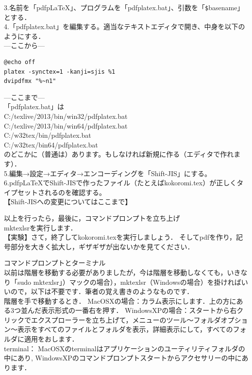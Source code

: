 \documentclass [10pt,fleqn,b5paper]{jsarticlek}
\begin{document}
3.名前を「pdfpLaTeX」、プログラムを「pdfplatex.bat」、引数を「\verb|$|basename」とする．\\
4.「pdfplatex.bat」を編集する。適当なテキストエディタで開き、中身を以下のようにする．\\
---ここから---
\begin{Verbatim}
@echo off
platex -synctex=1 -kanji=sjis %1
dvipdfmx "%~n1"
\end{Verbatim}
---ここまで---\\
「pdfplatex.bat」は\\
C:/texlive/2013/bin/win32/pdfplatex.bat\\
C:/texlive/2013/bin/win64/pdfplatex.bat\\
C:/w32tex/bin/pdfplatex.bat\\
C:/w32tex/bin64/pdfplatex.bat\\
のどこかに（普通は）あります。もしなければ新規に作る（エディタで作れます）．\\
5.編集→設定→エディタ→エンコーディングを「Shift-JIS」にする。\\
6.pdfpLaTeXでShift-JISで作ったファイル（たとえばkokoromi.tex）が正しくタイプセットされるのを確認する。\\

【{\gt Shift-JISへの変更についてはここまで}】
\vspace{2mm}

以上を行ったら，最後に，コマンドプロンプトを立ち上げ\\
mktexlsrを実行します．\\

【実験】さて，終了してkokoromi.texを実行しましょう．
そしてpdfを作り，記号部分を大きく拡大し，ギザギザが出ないかを見てください．


\kakkoshi\;コマンドプロンプトとターミナル\\
以前は階層を移動する必要がありましたが，今は階層を移動しなくても，いきなり「sudo mktexlsr」）マックの場合），mktexlsr（Windowsの場合）を掛ければいいので，以下は不要です．筆者の覚え書きのようなものです．\\
階層を手で移動するとき．
MacOSXの場合：カラム表示にします．上の方にある3つ並んだ表示形式の一番右を押す．
WindowsXPの場合：スタートから右クリックでエクスプローラーを立ち上げて，メニューのツール〜フォルダオプション〜表示をすべてのファイルとフォルダを表示，詳細表示にして，すべてのフォルダに適用をおします．\\
terminal：
MacOSXのterminalはアプリケーションのユーティリティフォルダの中にあり,
WindowsXPのコマンドプロンプトスタートからアクセサリーの中にあります．
\end{document}
